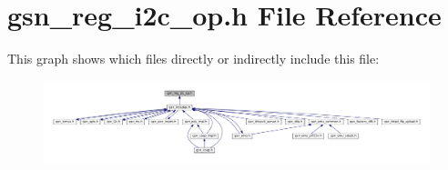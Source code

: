 \hypertarget{a00557}{
\section{gsn\_\-reg\_\-i2c\_\-op.h File Reference}
\label{a00557}
}
This graph shows which files directly or indirectly include this file:
\nopagebreak
\begin{figure}[H]
\begin{center}
\leavevmode
\includegraphics[width=400pt]{a00793}
\end{center}
\end{figure}
